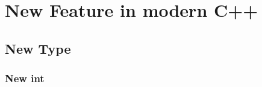 \documentclass[a4paper,11pt,twoside]{book}
\begin{document}
	
	

\chapter{New Feature in modern C++}

\section{New Type}

\subsection{New int}
\end{document}
